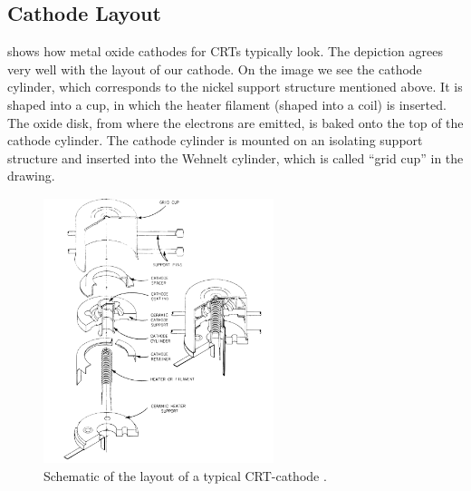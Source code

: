 \subsection{Cathode Layout}

 shows how metal oxide cathodes for CRTs typically look. The depiction agrees very well with the layout of our cathode. On the image we see the cathode cylinder, which corresponds to the nickel support structure mentioned above. It is shaped into a cup, in which the heater filament (shaped into a coil) is inserted. The oxide disk, from where the electrons are emitted, is baked onto the top of the cathode cylinder. The cathode cylinder is mounted on an isolating support structure and inserted into the Wehnelt cylinder, which is called ``grid cup'' in the drawing. 
  

\begin{figure}
	\centering
	\includegraphics[width=0.6\textwidth]{Chapters/CRT-Basics/Cathode_layout}
	\caption{Schematic of the layout of a typical CRT-cathode \cite{deVere69}.}
	\label{fig:cathodelayout}
\end{figure}














